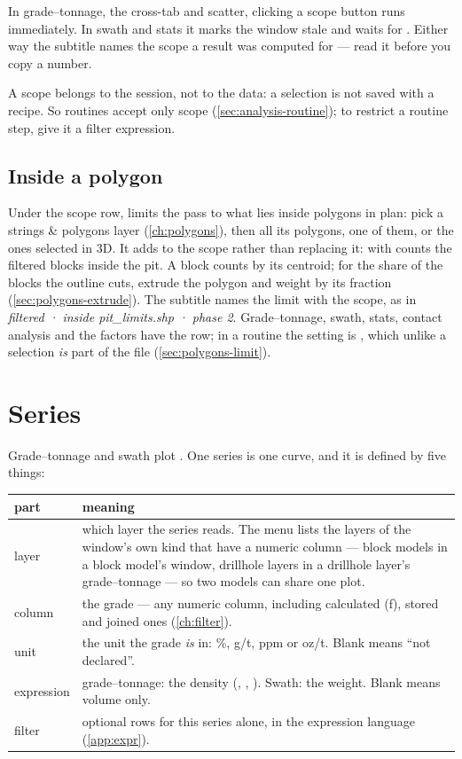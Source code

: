 \begin{caution}
In grade–tonnage, the cross-tab and scatter, clicking a scope button runs immediately. In swath and stats it marks the window stale and waits for . Either way the subtitle names the scope a result was computed for — read it before you copy a number.
\end{caution}

A scope belongs to the session, not to the data: a selection is not saved with a recipe. So routines accept only scope  (\cref{sec:analysis-routine}); to restrict a routine step, give it a filter expression.

\subsection{Inside a polygon}\label{sec:analysis-limit}
Under the scope row,  limits the pass to what lies inside polygons in plan: pick a strings \& polygons layer (\cref{ch:polygons}), then all its polygons, one of them, or the ones selected in 3D. It adds to the scope rather than replacing it:  with  counts the filtered blocks inside the pit. A block counts by its centroid; for the share of the blocks the outline cuts, extrude the polygon and weight by its fraction (\cref{sec:polygons-extrude}). The subtitle names the limit with the scope, as in \emph{filtered · inside pit\_limits.shp · phase 2}. Grade–tonnage, swath, stats, contact analysis and the factors have the row; in a routine the setting is , which unlike a selection \emph{is} part of the file (\cref{sec:polygons-limit}).

\section{Series}\label{sec:analysis-series}
Grade–tonnage and swath plot . One series is one curve, and it is defined by five things:

\medskip
\begin{tabularx}{\linewidth}{@{}lL@{}}\toprule
part & meaning \\ \midrule
layer & which layer the series reads. The menu lists the layers of the window's own kind that have a numeric column — block models in a block model's window, drillhole layers in a drillhole layer's grade–tonnage — so two models can share one plot. \\
column & the grade — any numeric column, including calculated (ƒ), stored and joined ones (\cref{ch:filter}). \\
unit & the unit the grade \emph{is} in: \%, g/t, ppm or oz/t. Blank means “not declared”. \\
expression & grade–tonnage: the density (, , ). Swath: the weight. Blank means volume only. \\
filter & optional rows for this series alone, in the expression language (\cref{app:expr}). \\ \bottomrule
\end{tabularx}
\medskip

